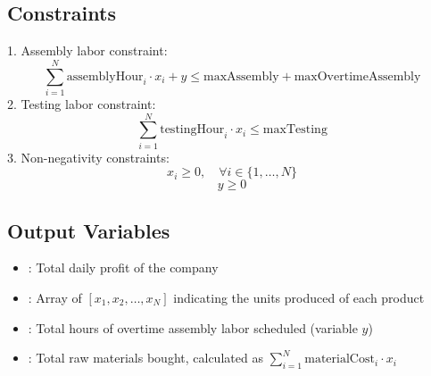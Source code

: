 \documentclass{article}
\begin{document}
\subsection*{Constraints}
1. Assembly labor constraint:
\[
\sum_{i=1}^{N} \text{assemblyHour}_i \cdot x_i + y \leq \text{maxAssembly} + \text{maxOvertimeAssembly}
\]
2. Testing labor constraint:
\[
\sum_{i=1}^{N} \text{testingHour}_i \cdot x_i \leq \text{maxTesting}
\]
3. Non-negativity constraints:
\[
x_i \geq 0, \quad \forall i \in \{1, \ldots, N\}
\]
\[
y \geq 0
\]

\subsection*{Output Variables}
\begin{itemize}
    \item {}: Total daily profit of the company
    \item {}: Array of \( [x_1, x_2, \ldots, x_N] \) indicating the units produced of each product
    \item {}: Total hours of overtime assembly labor scheduled (variable \( y \))
    \item {}: Total raw materials bought, calculated as \( \sum_{i=1}^{N} \text{materialCost}_i \cdot x_i \)
\end{itemize}
\end{document}
